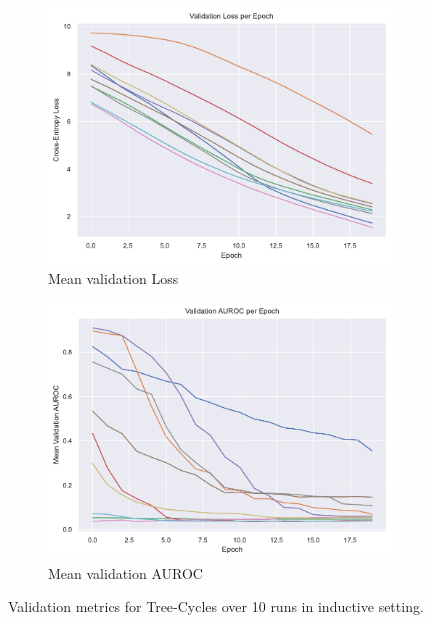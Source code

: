 \begin{figure}[htbp]
    \centering
    \begin{subfigure}[b]{0.48\textwidth}
        \centering
        \includegraphics[width=\textwidth]{img/plots/Cycles_val_loss_plot_NO_LEGEND.pdf}
        \caption{Mean validation Loss}
        \label{fig:Tree-Cycles-val_loss}
    \end{subfigure}
    \hfill
    \begin{subfigure}[b]{0.48\textwidth}
        \centering
        \includegraphics[width=\textwidth]{img/plots/Cycles_val_auroc_plot_NO_LEGEND.pdf}
        \caption{Mean validation AUROC}
        \label{fig:Tree-Cycles-val_auroc}
    \end{subfigure}
    \caption[Validation metrics for Tree-Cycles]{Validation metrics for Tree-Cycles over 10 runs in inductive setting.}
    \label{fig:Tree-Cycles-val_metrics}
\end{figure}

